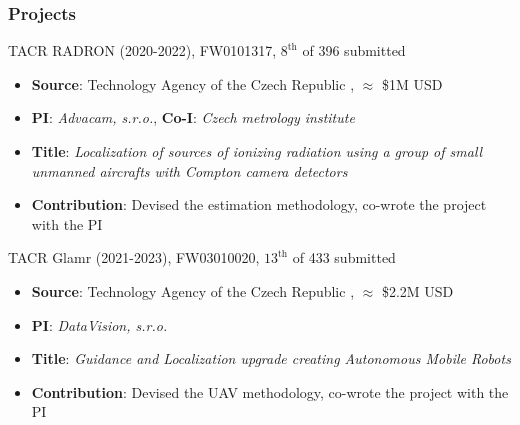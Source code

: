 \documentclass[aspectratio=169]{beamer}
\begin{document}


\begin{frame}
\frametitle{Projects}

\begin{block}{TACR RADRON (2020-2022), FW0101317, $8^{\mathrm{th}}$ of 396 submitted}
  \begin{itemize}
    \item \textbf{Source}: Technology Agency of the Czech Republic , $\approx$ \$1M USD
    \item \textbf{PI}: \emph{Advacam, s.r.o.}, \textbf{Co-I}: \emph{Czech metrology institute}
    \item \textbf{Title}: \emph{Localization of sources of ionizing radiation using a group of small unmanned aircrafts with Compton camera detectors}
    \item \textbf{Contribution}: Devised the estimation methodology, co-wrote the project with the PI
  \end{itemize}
\end{block}

\begin{block}{TACR Glamr (2021-2023), FW03010020, $13^{\mathrm{th}}$ of 433 submitted}
  \begin{itemize}
    \item \textbf{Source}: Technology Agency of the Czech Republic , $\approx$ \$2.2M USD
    \item \textbf{PI}: \emph{DataVision, s.r.o.}
    \item \textbf{Title}: \emph{Guidance and Localization upgrade creating Autonomous Mobile Robots}
    \item \textbf{Contribution}: Devised the UAV methodology, co-wrote the project with the PI
  \end{itemize}
\end{block}

\end{frame}


\end{document}
